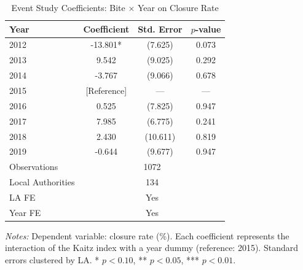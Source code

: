 \begin{table}[htbp]
\centering
\begin{threeparttable}
\caption{Event Study Coefficients: Bite $\times$ Year on Closure Rate}
\label{tab:event_study}
\begin{tabular}{lccc}
\toprule
Year & Coefficient & Std. Error & $p$-value \\
\midrule
2012 & -13.801* & (7.625) & 0.073 \\
2013 & 9.542 & (9.025) & 0.292 \\
2014 & -3.767 & (9.066) & 0.678 \\
2015 & [Reference] & --- & --- \\
\midrule
2016 & 0.525 & (7.825) & 0.947 \\
2017 & 7.985 & (6.775) & 0.241 \\
2018 & 2.430 & (10.611) & 0.819 \\
2019 & -0.644 & (9.677) & 0.947 \\
\midrule
Observations & \multicolumn{3}{c}{1072} \\
Local Authorities & \multicolumn{3}{c}{134} \\
LA FE & \multicolumn{3}{c}{Yes} \\
Year FE & \multicolumn{3}{c}{Yes} \\
\bottomrule
\end{tabular}
\begin{tablenotes}
\small
\item \textit{Notes:} Dependent variable: closure rate (\%). Each coefficient represents the interaction of the Kaitz index with a year dummy (reference: 2015). Standard errors clustered by LA. * $p<0.10$, ** $p<0.05$, *** $p<0.01$.
\end{tablenotes}
\end{threeparttable}
\end{table}
